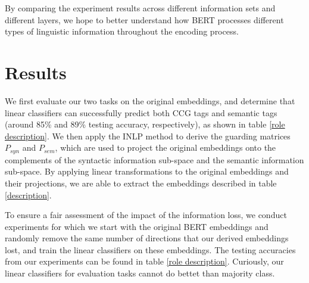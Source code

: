 \documentclass[11pt,a4paper]{article}
\begin{document}
By comparing the experiment results across different information sets and different layers, we hope to better understand how BERT processes different types of linguistic information throughout the encoding process.





\section{Results}
\label{sec:result}
We first evaluate our two tasks on the original embeddings, and determine that linear classifiers can successfully predict both CCG tags and semantic tags (around 85\% and 89\% testing accuracy, respectively), as shown in table \ref{role description}. We then apply the INLP method to derive the guarding matrices $P_{syn}$ and $P_{sem}$, which are used to project the original embeddings onto the complements of the syntactic information sub-space and the semantic information sub-space. By applying linear transformations to the original embeddings and their projections, we are able to extract the embeddings described in table \ref{description}.

To ensure a fair assessment of the impact of the information loss, we conduct experiments for which we start with the original BERT embeddings and randomly remove the same number of directions that our derived embeddings lost, and train the linear classifiers on these embeddings. The testing accuracies from our experiments can be found in table \ref{role description}. Curiously, our linear classifiers for evaluation tasks cannot do bettet than majority class.
\end{document}

